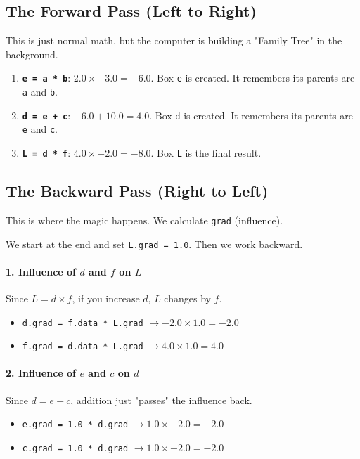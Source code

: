 \documentclass[11pt]{article}
\begin{document}
\subsection{The Forward Pass (Left to Right)}
This is just normal math, but the computer is building a "Family Tree" in the background.
\begin{enumerate}
    \item \textbf{\texttt{e = a * b}}: $2.0 \times -3.0 = -6.0$. Box \texttt{e} is created. It remembers its parents are \texttt{a} and \texttt{b}.
    \item \textbf{\texttt{d = e + c}}: $-6.0 + 10.0 = 4.0$. Box \texttt{d} is created. It remembers its parents are \texttt{e} and \texttt{c}.
    \item \textbf{\texttt{L = d * f}}: $4.0 \times -2.0 = -8.0$. Box \texttt{L} is the final result.
\end{enumerate}

\subsection{The Backward Pass (Right to Left)}
This is where the magic happens. We calculate \texttt{grad} (influence).

\begin{tcolorbox}[colback=blue!5!white,colframe=blue!75!black,title=The Goal]
We start at the end and set \texttt{L.grad = 1.0}. Then we work backward.
\end{tcolorbox}

\paragraph{1. Influence of $d$ and $f$ on $L$}
Since $L = d \times f$, if you increase $d$, $L$ changes by $f$. 
\begin{itemize}
    \item \texttt{d.grad = f.data * L.grad} $\rightarrow -2.0 \times 1.0 = \mathbf{-2.0}$
    \item \texttt{f.grad = d.data * L.grad} $\rightarrow 4.0 \times 1.0 = \mathbf{4.0}$
\end{itemize}

\paragraph{2. Influence of $e$ and $c$ on $d$}
Since $d = e + c$, addition just "passes" the influence back. 
\begin{itemize}
    \item \texttt{e.grad = 1.0 * d.grad} $\rightarrow 1.0 \times -2.0 = \mathbf{-2.0}$
    \item \texttt{c.grad = 1.0 * d.grad} $\rightarrow 1.0 \times -2.0 = \mathbf{-2.0}$
\end{itemize}
\end{document}
